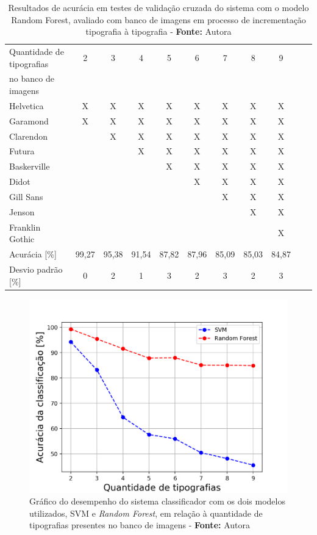 
\begin{table}[h]
 \centering
 \begin{tabular}{l|c|c|c|c|c|c|c|c|c|c}
    Quantidade de tipografias  & 2 & 3 & 4 & 5 & 6 & 7 & 8 & 9\\ no banco de imagens & & & & & & & & \\
	\hline
	Helvetica & X & X & X & X & X & X & X & X   \\
	Garamond & X & X & X & X & X & X & X & X  \\
	Clarendon &  & X & X & X & X & X & X & X    \\
	Futura &  &  & X & X & X & X & X & X  \\
	Baskerville &  &  &  & X & X & X & X & X    \\
	Didot &  &  &  &  & X & X & X & X    \\
	Gill Sans &  &  &  &  &  & X & X & X   \\
	Jenson &  &  &  &  &  &  & X & X  \\
	Franklin Gothic &  &  &  &  &  &  &  & X  \\
	\hline
	Acurácia [\%] & 99,27 & 95,38 & 91,54 & 87,82 & 87,96 & 85,09 & 85,03 & 84,87 \\
	Desvio padrão [\%] & 0 & 2 & 1 & 3 & 2 & 3 & 2 & 3\\
 \end{tabular}
 \caption{Resultados de acurácia em testes de validação cruzada do sistema com o modelo Random Forest, avaliado com banco de imagens em processo de incrementação tipografia à tipografia - \textbf{Fonte:} Autora}
 \label{tab:rfcResults}
\end{table}



\begin{figure}[H]
 \centering
  \includegraphics[width=0.7\linewidth]{figuras/graficosvmrfc.pdf}
  \caption{Gráfico do desempenho do sistema classificador com os dois modelos utilizados, SVM e \textit{Random Forest}, em relação à quantidade de tipografias presentes no banco de imagens - \textbf{Fonte:} Autora}
  \label{fig:grafico2}
\end{figure}

